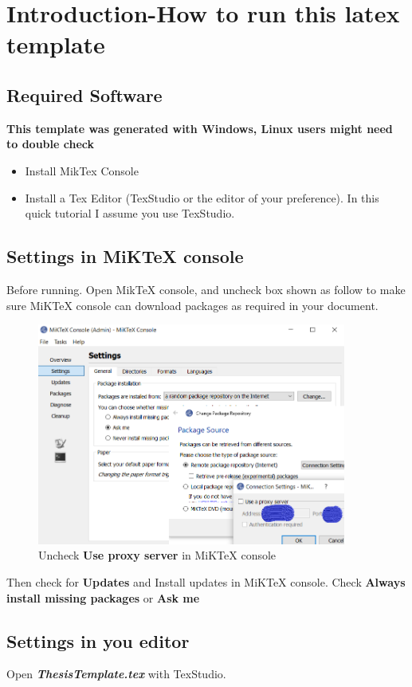 \chapter{Introduction-How to run this latex template} \label{chapter:introduction}
\section{Required Software}
\textbf{This template was generated with Windows, Linux users might need to double check} 
\begin{itemize}
	\item Install MikTex Console
	\item Install a Tex Editor (TexStudio or the editor of your preference). In this quick tutorial I assume you use TexStudio.
\end{itemize}
\section{Settings in MiKTeX console}
	Before running. Open MikTeX console, and uncheck box shown as follow to make sure MiKTeX console can download packages as required in your document. 
	
	\begin{figure}[h]                      
		\centering                             
		\includegraphics[width = 4in]{figures/UncheckProxyServer.png}
		\caption{Uncheck \textbf{Use proxy server} in MiKTeX console}
		\label{figConquistador}                         
	\end{figure} 
	Then check for \textbf{Updates} and Install updates in MiKTeX console. Check \textbf{Always install missing packages} or \textbf{Ask me}
\section{Settings in you editor}
Open \textbf{\textit{ThesisTemplate.tex}} with TexStudio.

